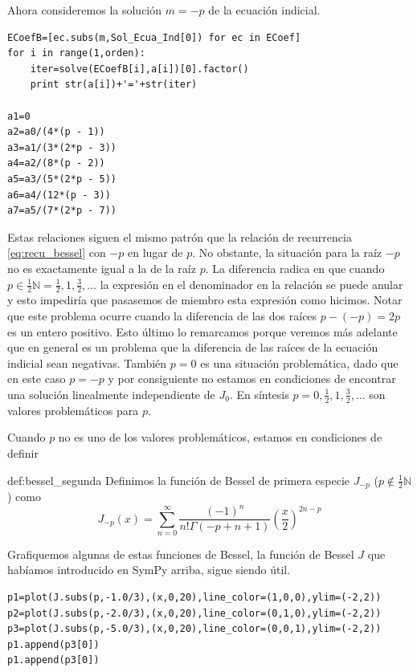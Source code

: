 Ahora consideremos la solución $m=-p$ de la ecuación indicial.
\begin{lstlisting}
ECoefB=[ec.subs(m,Sol_Ecua_Ind[0]) for ec in ECoef]
for i in range(1,orden):
    iter=solve(ECoefB[i],a[i])[0].factor()
    print str(a[i])+'='+str(iter)

a1=0
a2=a0/(4*(p - 1))
a3=a1/(3*(2*p - 3))
a4=a2/(8*(p - 2))
a5=a3/(5*(2*p - 5))
a6=a4/(12*(p - 3))
a7=a5/(7*(2*p - 7))

\end{lstlisting}
Estas relaciones siguen el mismo patrón que la relación de recurrencia \eqref{eq:recu_bessel} con $-p$ en lugar de $p$. No obstante, la situación para la raíz $-p$ no es exactamente igual a la de la raíz $p$. La diferencia radica en que cuando $p\in\frac12\mathbb{N}=\frac12,1,\frac32,\ldots$  la expresión en el denominador en la relación
se puede anular y esto  impediría que pasasemos de miembro esta expresión como hicimos. Notar que este problema ocurre cuando la diferencia de las dos raíces $p-(-p)=2p$ es un entero positivo.  Esto último lo remarcamos porque veremos más adelante que en general es un problema que la diferencia de las raíces de la ecuación indicial sean negativas. También $p=0$ es una situación problemática, dado que en este caso $p=-p$ y por consiguiente no estamos en condiciones de encontrar una solución linealmente independiente de $J_0$. En síntesis $p=0,\frac12,1,\frac32,\ldots$ son valores problemáticos para $p$.

Cuando $p$ no es uno de los valores problemáticos, estamos en condiciones de definir
\begin{definicion}{def:bessel_segunda} Definimos la función de Bessel de primera especie $J_{-p}$ ($p\notin\frac12\mathbb{N}$) como
\[J_{-p}(x)=\sum_{n=0}^{\infty}\frac{(-1)^n}{n!\Gamma(-p+n+1)}\left(\frac{x}{2}\right)^{2n-p}\]
\end{definicion}
Grafiquemos algunas de estas funciones de Bessel, la función de Bessel $J$ que habíamos introducido en SymPy arriba, sigue siendo útil.
\begin{lstlisting}
p1=plot(J.subs(p,-1.0/3),(x,0,20),line_color=(1,0,0),ylim=(-2,2))
p2=plot(J.subs(p,-2.0/3),(x,0,20),line_color=(0,1,0),ylim=(-2,2))
p3=plot(J.subs(p,-5.0/3),(x,0,20),line_color=(0,0,1),ylim=(-2,2))
p1.append(p3[0])
p1.append(p3[0])
\end{lstlisting}

